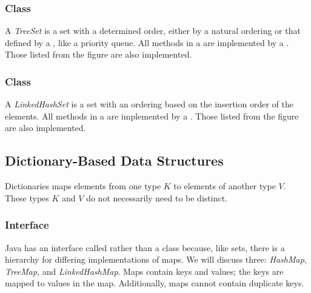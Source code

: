 \subsubsection*{ Class}
A \textit{TreeSet} is a set with a determined order, either by a natural ordering or that defined by a , like a priority queue. All methods in a  are implemented by a . Those listed from the  figure are also implemented.

\subsubsection*{ Class}
A \textit{LinkedHashSet} is a set with an ordering based on the insertion order of the elements. All methods in a  are implemented by a . Those listed from the  figure are also implemented.

\subsection*{Dictionary-Based Data Structures}
Dictionaries maps elements from one type $K$ to elements of another type $V$. These types $K$ and $V$ do not necessarily need to be distinct. 

\subsubsection*{ Interface}
Java has an interface called  rather than a class because, like sets, there is a hierarchy for differing implementations of maps. We will discuss three: \textit{HashMap}, \textit{TreeMap}, and \textit{LinkedHashMap}. Maps contain keys and values; the keys are mapped to values in the map. Additionally, maps cannot contain duplicate keys.

